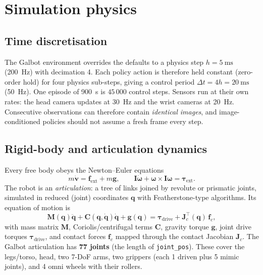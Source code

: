 \documentclass[10pt,a4paper]{article}
\newcommand{\T}{^{\!\top}}
\begin{document}
\section{Simulation physics}
\subsection{Time discretisation}
The Galbot environment overrides the defaults to a physics step $h=\SI{5}{\milli\second}$ (\SI{200}{\hertz}) with decimation 4. Each policy action is therefore held constant (zero-order hold) for four physics sub-steps, giving a control period $\Delta t=4h=\SI{20}{\milli\second}$ (\SI{50}{\hertz}). One episode of \SI{900}{\second} is $45\,000$ control steps. Sensors run at their own rates: the head camera updates at \SI{30}{\hertz} and the wrist cameras at \SI{20}{\hertz}. Consecutive observations can therefore contain \emph{identical images}, and image-conditioned policies should not assume a fresh frame every step.

\subsection{Rigid-body and articulation dynamics}
Every free body obeys the Newton--Euler equations
\begin{equation}
m\dot{\bm v}=\bm f_{\text{ext}}+m\bm g,\qquad \bm I\dot{\bm\omega}+\bm\omega\times\bm I\bm\omega=\bm\tau_{\text{ext}} .
\end{equation}
The robot is an \emph{articulation}: a tree of links joined by revolute or prismatic joints, simulated in reduced (joint) coordinates $\bm q$ with Featherstone-type algorithms. Its equation of motion is
\begin{equation}
\bm M(\bm q)\ddot{\bm q}+\bm C(\bm q,\dot{\bm q})\dot{\bm q}+\bm g(\bm q)=\bm\tau_{\text{drive}}+\bm J_c\T(\bm q)\,\bm f_c ,
\label{eq:eom}
\end{equation}
with mass matrix $\bm M$, Coriolis/centrifugal terms $\bm C$, gravity torque $\bm g$, joint drive torques $\bm\tau_{\text{drive}}$, and contact forces $\bm f_c$ mapped through the contact Jacobian $\bm J_c$. The Galbot articulation has \textbf{77 joints} (the length of \texttt{joint\_pos}). These cover the legs/torso, head, two 7-DoF arms, two grippers (each 1 driven plus 5 mimic joints), and 4 omni wheels with their rollers.
\end{document}
